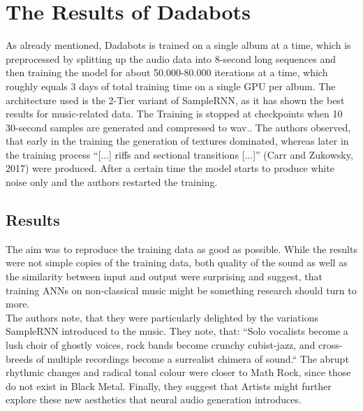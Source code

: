 \documentclass[a4paper, 11pt]{report}
\begin{document}
\chapter{The Results of Dadabots}
As already mentioned, Dadabots is trained on a single album at a time, which 
is preprocessed by splitting up the audio data into 8-second long sequences and 
then training the model for about 50.000-80.000 iterations at a time, which 
roughly equals 3 days of total training time on a single GPU per album. The 
architecture used is the 2-Tier variant of SampleRNN, as it has shown the best 
results for music-related data. The Training is stopped at checkpoints when 10 
30-second samples are generated and compressed to wav.. The authors observed, 
that early in the training the generation of textures dominated, whereas later 
in the training process “[...] riffs and sectional transitions [...]” (Carr
and Zukowsky, 2017) were 
produced. After a certain time the model starts to produce white noise only 
and the authors restarted the training.

\section{Results}
The aim was to reproduce the training data as good as possible. While the 
results were not simple copies of the training data, both quality of the sound 
as well as the similarity between input and output were surprising and suggest, 
that training ANNs on non-classical music might be something research should 
turn to more. \\
The authors note, that they were particularly delighted by the variations 
SampleRNN introduced to the music. They note, that: “Solo vocalists become a 
lush choir of ghostly voices, rock bands become crunchy cubist-jazz, and cross-
breeds of multiple recordings become a surrealist chimera of sound.“\cite[p.3]{zukowski2018generating} 
The abrupt 
rhythmic changes and radical tonal colour were closer to Math Rock, since those 
do not exist in Black Metal. Finally, they suggest that Artists might further 
explore these new aesthetics that neural audio generation introduces.
\end{document}
